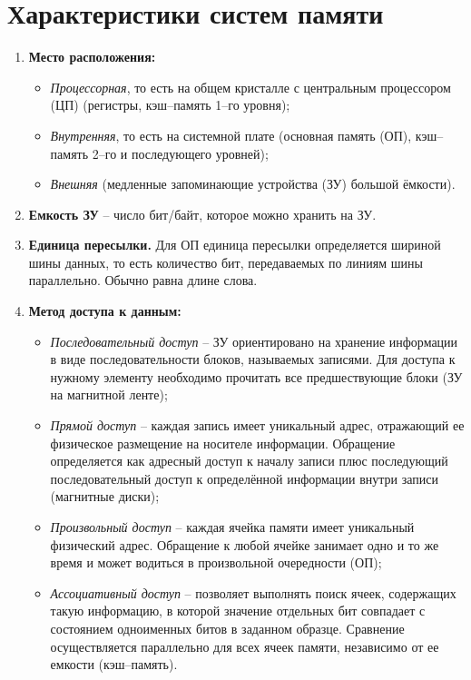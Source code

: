 \section{Характеристики систем памяти}
\begin{enumerate}
  \item\textbf{ Место расположения:}
  \begin{itemize}
    \item \emph{Процессорная}, то есть на общем кристалле с центральным процессором (ЦП) (регистры, кэш--память 1--го уровня);
    \item \emph{Внутренняя}, то есть на системной плате (основная память (ОП), кэш--память 2--го и последующего уровней);
    \item \emph{Внешняя} (медленные запоминающие устройства (ЗУ) большой ёмкости).
  \end{itemize}
  \item \textbf{Емкость ЗУ} -- число бит/байт, которое можно хранить на ЗУ.
  \item \textbf{Единица пересылки.} Для ОП единица пересылки определяется шириной шины данных, то есть количество бит, передаваемых по линиям шины параллельно. Обычно равна длине слова.
  \item \textbf{Метод доступа к данным:}
  \begin{itemize}
    \item \emph{Последовательный доступ} -- ЗУ ориентировано на хранение информации в виде последовательности блоков, называемых записями. Для доступа к нужному элементу необходимо прочитать все предшествующие блоки (ЗУ на магнитной ленте);
    \item \emph{Прямой доступ} -- каждая запись имеет уникальный адрес, отражающий ее физическое размещение на носителе информации. Обращение определяется как адресный доступ к началу записи плюс последующий последовательный доступ к определённой информации внутри записи (магнитные диски);
    \item \emph{Произвольный доступ} -- каждая ячейка памяти имеет уникальный физический адрес. Обращение к любой ячейке занимает одно и то же время и может водиться в произвольной очередности (ОП);
    \item \emph{Ассоциативный доступ} -- позволяет выполнять поиск ячеек, содержащих такую информацию, в которой значение отдельных бит совпадает с состоянием одноименных битов в заданном образце. Сравнение осуществляется параллельно для всех ячеек памяти, независимо от ее емкости (кэш--память).
  \end{itemize}

\end{enumerate}
